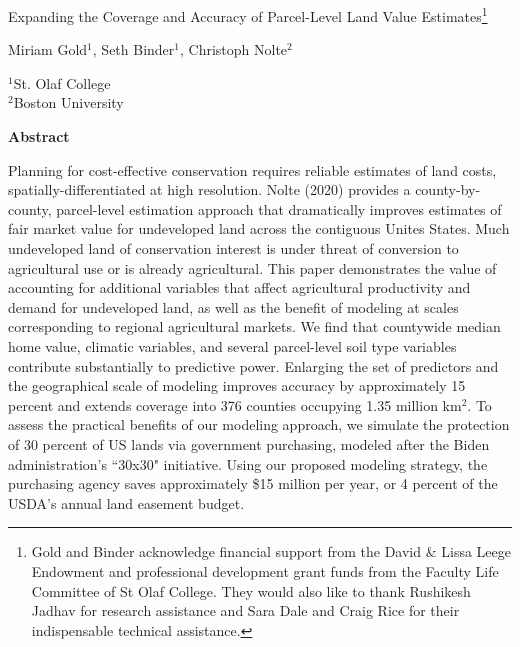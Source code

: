 \documentclass[12pt]{article}
\begin{document}
\hspace{5pt}

\Large
 \begin{center}
Expanding the Coverage and Accuracy of Parcel-Level Land Value Estimates\footnote[2]{Gold and Binder acknowledge financial support from the David \& Lissa Leege Endowment and professional development grant funds from the Faculty Life Committee of St Olaf College. They would also like to thank Rushikesh Jadhav for research assistance and Sara Dale and Craig Rice for their indispensable technical assistance.}\\ 

\vspace{10pt}

\large
Miriam Gold$^1$, Seth Binder$^1$, Christoph Nolte$^2$ \\

\vspace{10pt}

\footnotesize  
$^{1}$St. Olaf College\\
$^2$Boston University

\vspace{40pt} 

    \normalsize
    \textbf{Abstract}
\end{center}

\normalsize
Planning for cost-effective conservation requires reliable estimates of land costs, spatially-differentiated at high resolution. Nolte (2020) provides a county-by-county, parcel-level estimation approach that dramatically improves estimates of fair market value for undeveloped land across the contiguous Unites States. Much undeveloped land of conservation interest is under threat of conversion to agricultural use or is already agricultural. This paper demonstrates the value of accounting for additional variables that affect agricultural productivity and demand for undeveloped land, as well as the benefit of modeling at scales corresponding to regional agricultural markets. We find that countywide median home value, climatic variables, and several parcel-level soil type variables contribute substantially to predictive power. Enlarging the set of predictors and the geographical scale of modeling improves accuracy by approximately 15 percent and extends coverage into 376 counties occupying 1.35 million km$^2$. To assess the practical benefits of our modeling approach, we simulate the protection of 30 percent of US lands via government purchasing, modeled after the Biden administration's ``30x30" initiative. Using our proposed modeling strategy, the purchasing agency saves approximately \$15 million per year, or 4 percent of the USDA's annual land easement budget. 
\end{document}
